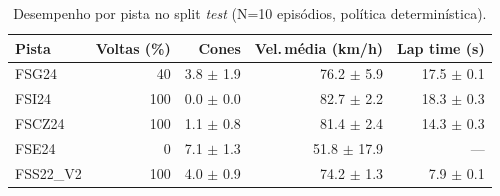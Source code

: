 \begin{table}[H]
\centering
\caption{Desempenho por pista no split \textit{test} (N=10 episódios, política determinística).}
\label{tab:per_track_test}
\begin{tabular}{lrrrr}
\toprule
\textbf{Pista} & \textbf{Voltas (\%)} & \textbf{Cones} & \textbf{Vel.\,m\'edia (km/h)} & \textbf{Lap time (s)} \\
\midrule
FSG24 & 40 & 3.8 $\pm$ 1.9 & 76.2 $\pm$ 5.9 & 17.5 $\pm$ 0.1 \\
FSI24 & 100 & 0.0 $\pm$ 0.0 & 82.7 $\pm$ 2.2 & 18.3 $\pm$ 0.3 \\
FSCZ24 & 100 & 1.1 $\pm$ 0.8 & 81.4 $\pm$ 2.4 & 14.3 $\pm$ 0.3 \\
FSE24 & 0 & 7.1 $\pm$ 1.3 & 51.8 $\pm$ 17.9 & --- \\
FSS22_V2 & 100 & 4.0 $\pm$ 0.9 & 74.2 $\pm$ 1.3 & 7.9 $\pm$ 0.1 \\
\bottomrule
\end{tabular}
\end{table}
